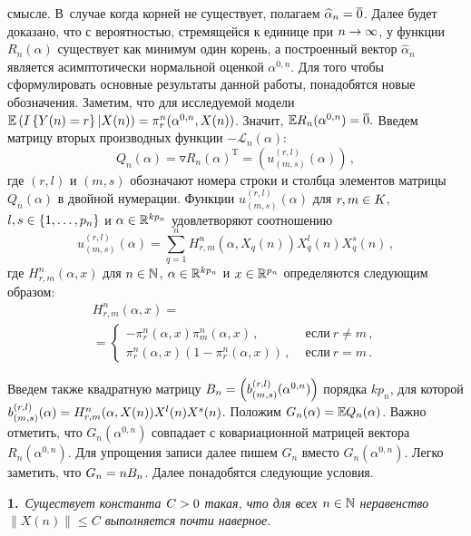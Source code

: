 \begin{multicols}{2}
смысле. В~случае когда корней не существует, полагаем $\widehat{\alpha}_n\hm=\overline{0}$. 
Далее будет доказано, что с вероятностью, стремящейся к единице при $n\hm\rightarrow\infty$, 
у функции $R_n(\alpha)$ существует как минимум один корень, а построенный вектор 
$\widehat{\alpha}_n$ является асимптотически нормальной оценкой $\alpha^{0,n}$. 
Для того чтобы сформулировать основные результаты данной работы, понадобятся новые 
обозначения. Заметим, что для 
исследуемой модели $\E\left(I\left\{ Y(n)\hm=r\right\}|X(n)\right)\hm=
\pi^n_r(\alpha^{0,n}, X(n))$. Значит, $\E R_n(\alpha^{0,n})\hm=\overline{0}.$ 
Введем матрицу вторых производных функции $-\mathcal{L}_n(\alpha)$:
\begin{equation*}
Q_n(\alpha)= \triangledown R_n(\alpha)^{\mathrm{T}}= \left(u_{(m,s)}^{(r,l)}(\alpha)\right)\,,
\end{equation*}
где $(r,l)$ и $(m,s)$ обозначают номера строки и столбца элементов матрицы $Q_n(\alpha)$ в 
двойной нумерации. Функции $u_{(m,s)}^{(r,l)}(\alpha)$ для $r,m\hm\in K$, 
$l,s\hm\in\left\{1,\ldots,p_n\right\}$ и $\alpha\hm\in\R^{kp_n}$ удовлетворяют соотношению
\begin{equation*}
u_{(m,s)}^{(r,l)}(\alpha)=\sum\limits_{q=1}^nH^n_{r,m}(\alpha, X_q(n))X_q^l(n)X_q^s(n)\,,
\end{equation*}
где $H^n_{r,m}(\alpha,x)$ для $n\hm\in\N$, $\alpha\hm\in\R^{kp_n}$ и $x\hm\in\R^{p_n}$ 
определяются следующим образом:
\begin{multline}
H^n_{r,m}(\alpha,x)={}\\
{}=
\begin{cases}
-\pi^n_r(\alpha,x)\pi^n_m(\alpha,x)\,,&\mbox{ если}\  r\neq m\,,\\
\pi^n_r(\alpha,x)(1-\pi^n_r(\alpha,x))\,,&\mbox{ если}\   r=m\,.
\end{cases}
\label{eq7}
\end{multline}

Введем также квадратную матрицу $B_n\hm=\left(b_{(m,s)}^{(r,l)}(\alpha^{0,n})\right)$ 
порядка $kp_n$, для которой $b_{(m,s)}^{(r,l)}(\alpha)\hm=H^n_{r,m}(\alpha, X(n))X^l(n)X^s(n)$. 
Положим $G_n(\alpha)\hm=\E Q_n(\alpha)$. Важно отметить, что $G_n(\alpha^{0,n})$ совпадает 
с ковариационной матрицей вектора $R_n(\alpha^{0,n})$. Для упрощения записи далее пишем $G_n$ 
вместо $G_n(\alpha^{0,n})$. Легко заметить, что $G_n\hm=nB_n$. Далее понадобятся следующие условия.

\medskip

\noindent
\textbf{1.}\ \textit{Существует константа $C\hm>0$ такая, что для всех $n\hm\in\N$ 
неравенство $\|X(n)\|\leq C$ выполняется почти наверное}.


\end{multicols}
